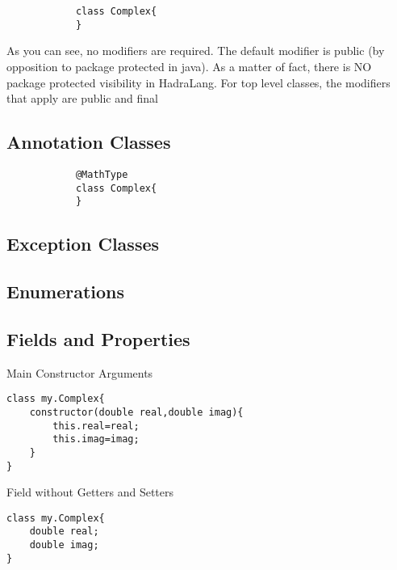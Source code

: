 \documentclass{tufte-book}
\begin{document}
            \begin{lstlisting}
            class Complex{
            }
            \end{lstlisting}


            As you can see, no modifiers are required. The default modifier is \textcolor{keyword1}{public}  (by opposition to package protected in java). As a matter of fact, there is NO package protected visibility in HadraLang. For top level classes, the modifiers that apply are public and final


            \subsection{Annotation Classes}
            \begin{lstlisting}
            @MathType
            class Complex{
            }
            \end{lstlisting}



            \subsection{Exception Classes}
            \subsection{Enumerations}



            \subsection{Fields and Properties}

            Main Constructor Arguments
\lstset{mathescape=true}
            \begin{lstlisting}
class my.Complex{
    constructor(double real,double imag){
        this.real=real;
        this.imag=imag;
    }
}
            \end{lstlisting}
\lstset{mathescape=false}

            Field without Getters and Setters
\lstset{mathescape=true}
            \begin{lstlisting}
class my.Complex{
    double real;
    double imag;
}
            \end{lstlisting}
\lstset{mathescape=false}
\end{document}
